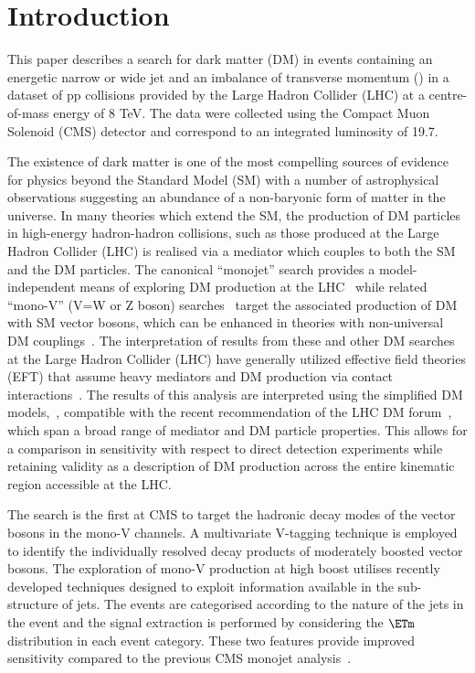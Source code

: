 \section{Introduction}
This paper describes a search for dark matter (DM) in events containing an energetic narrow or wide jet and an imbalance of transverse momentum (\ETm) in a dataset 
of pp collisions provided by the Large Hadron Collider (LHC) at a centre-of-mass energy of 8 TeV. The data were collected using the Compact Muon Solenoid (CMS) 
detector and correspond to an integrated luminosity of 19.7\fbinv. 

The existence of dark matter is one of the most compelling sources of evidence for physics beyond the Standard Model (SM) with a number of astrophysical observations 
suggesting an abundance of a non-baryonic form of matter in the universe. In many theories which extend the SM, the production of DM particles in high-energy hadron-hadron 
collisions, such as those produced at the Large Hadron Collider (LHC) is realised via a mediator which couples to both the SM and the DM particles.  
The canonical ``monojet'' search provides a model-independent means of exploring DM production at the LHC~\cite{monojet1,monojet2} while 
related ``mono-V'' (V=W or Z boson) searches~\cite{monolep,monoZHbb,Aad:2014vka,Aad:2013oja,ATLAS:2014wra} target the associated production of DM with SM vector bosons, 
which can be enhanced in theories with non-universal DM couplings~\cite{IVDM}.  The interpretation of results from these and other DM searches at 
the Large Hadron Collider (LHC) have generally utilized effective field theories (EFT) that assume heavy mediators and DM production via contact interactions~\cite{Fox:2011pm}.  
The results of this analysis are interpreted using the simplified DM models,~\cite{simplified1,Buchmueller:2013dya,Buchmueller:2014yoa}, compatible with the recent recommendation of the LHC DM forum~\cite{Abercrombie:2015wmb}, which span a broad range of 
mediator and DM particle properties. This allows for a comparison in sensitivity with respect to direct detection experiments while retaining validity as a description of DM 
production across the entire kinematic region accessible at the LHC. 

The search is the first at CMS to target the hadronic decay modes of the vector bosons in the mono-V channels. A multivariate V-tagging technique is 
employed to identify the individually resolved decay products of moderately boosted vector bosons. The exploration of mono-V production at high boost 
utilises recently developed techniques designed to exploit information 
available in the sub-structure of jets. The events are categorised according to the nature of the jets in the event and the signal extraction is performed by 
considering the $\ETm$ distribution in each event category. These two features provide improved sensitivity compared to the previous CMS monojet analysis~\cite{monojet1}. 


